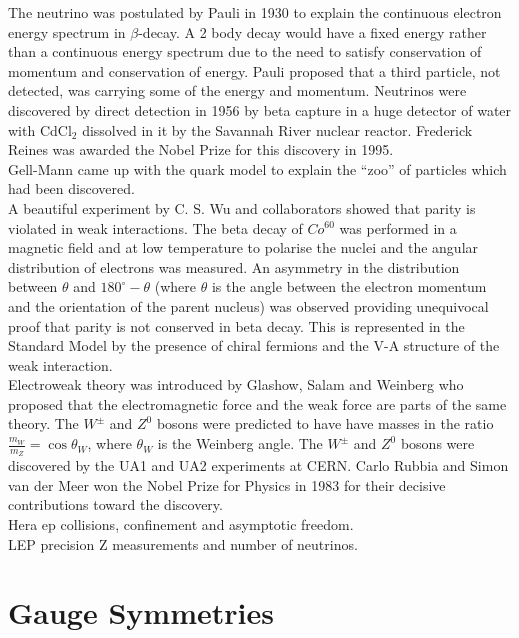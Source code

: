 The neutrino was postulated by Pauli in 1930 to explain the continuous electron 
energy spectrum in $\beta$-decay. A 2 body decay would have a fixed energy
rather than a continuous energy spectrum due to the need to satisfy conservation
of momentum and conservation of energy. Pauli proposed that a third particle,
not detected, was carrying some of the energy and momentum. Neutrinos were 
discovered by direct detection in 1956 by beta capture in a huge detector of
water with CdCl$_{2}$ dissolved in it by the Savannah River nuclear reactor. 
Frederick Reines was awarded the Nobel Prize for this discovery in 1995. \\

Gell-Mann came up with the quark model to explain the ``zoo'' of particles which
had been discovered. \\

A beautiful experiment by C. S. Wu and collaborators showed that parity is
violated in weak interactions. The beta decay of $Co^{60}$ was performed in a
magnetic field and at low temperature to polarise the nuclei and the angular
distribution of electrons was measured. An asymmetry in the distribution between
$\theta$ and $180^{\circ} - \theta$ (where $\theta$ is the angle between the
electron momentum and the orientation of the parent nucleus) was observed
providing unequivocal proof that parity is not conserved in beta decay. This is
represented in the Standard Model by the presence of chiral fermions and the V-A 
structure of the weak interaction. \\

Electroweak theory was introduced by Glashow, Salam and Weinberg who proposed
that the electromagnetic force and the weak force are parts of the same theory. 
The $W^{\pm}$ and $Z^{0}$ bosons were predicted to have have masses in the ratio
$\frac{m_{W}}{m_{Z}} = \cos{\theta_{W}}$, where $\theta_{W}$ is the
Weinberg angle. The $W^{\pm}$ and $Z^{0}$ bosons were discovered by the UA1 and 
UA2 experiments at CERN. Carlo Rubbia and Simon van der Meer won the Nobel Prize
for Physics in 1983 for their decisive contributions toward the discovery. \\

Hera ep collisions, confinement and asymptotic freedom. \\

LEP precision Z measurements and number of neutrinos.

\section{Gauge Symmetries}

